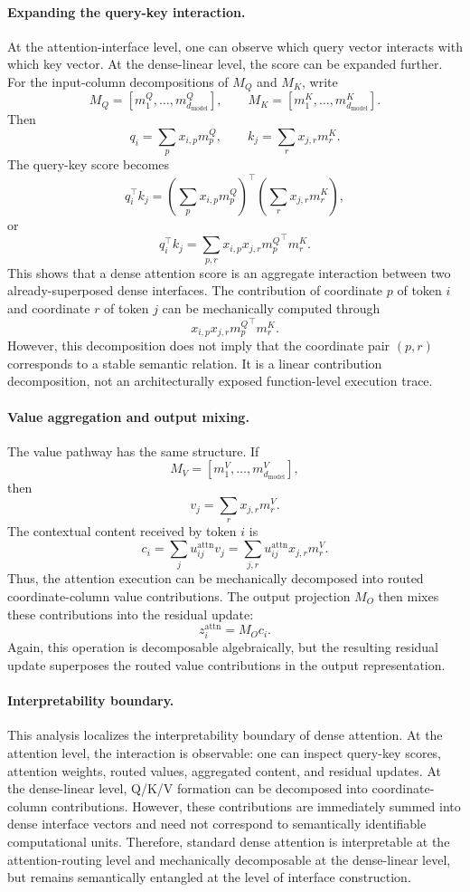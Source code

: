 \documentclass{article}
\begin{document}
\paragraph{Expanding the query-key interaction.}
At the attention-interface level, one can observe which query vector interacts with which key vector. At the dense-linear level, the score can be expanded further. For the input-column decompositions of \(M_Q\) and \(M_K\), write
\[
M_Q=[m^Q_1,\ldots,m^Q_{d_{\mathrm{model}}}],\qquad
M_K=[m^K_1,\ldots,m^K_{d_{\mathrm{model}}}].
\]
Then
\[
q_i=\sum_p x_{i,p}m^Q_p,\qquad
k_j=\sum_r x_{j,r}m^K_r.
\]
The query-key score becomes
\[
q_i^\top k_j
=
\left(\sum_p x_{i,p}m^Q_p\right)^\top
\left(\sum_r x_{j,r}m^K_r\right),
\]
or
\[
q_i^\top k_j
=
\sum_{p,r}
x_{i,p}x_{j,r}
{m^Q_p}^{\top}m^K_r.
\]
This shows that a dense attention score is an aggregate interaction between two already-superposed dense interfaces. The contribution of coordinate \(p\) of token \(i\) and coordinate \(r\) of token \(j\) can be mechanically computed through
\[
x_{i,p}x_{j,r}{m^Q_p}^{\top}m^K_r.
\]
However, this decomposition does not imply that the coordinate pair \((p,r)\) corresponds to a stable semantic relation. It is a linear contribution decomposition, not an architecturally exposed function-level execution trace.

\paragraph{Value aggregation and output mixing.}
The value pathway has the same structure. If
\[
M_V=[m^V_1,\ldots,m^V_{d_{\mathrm{model}}}],
\]
then
\[
v_j = \sum_r x_{j,r}m^V_r.
\]
The contextual content received by token \(i\) is
\[
c_i
=
\sum_j u^{\mathrm{attn}}_{ij}v_j
=
\sum_{j,r}
u^{\mathrm{attn}}_{ij}x_{j,r}m^V_r.
\]
Thus, the attention execution can be mechanically decomposed into routed coordinate-column value contributions. The output projection \(M_O\) then mixes these contributions into the residual update:
\[
z_i^{\mathrm{attn}}=M_Oc_i.
\]
Again, this operation is decomposable algebraically, but the resulting residual update superposes the routed value contributions in the output representation.

\paragraph{Interpretability boundary.}
This analysis localizes the interpretability boundary of dense attention. At the attention level, the interaction is observable: one can inspect query-key scores, attention weights, routed values, aggregated content, and residual updates. At the dense-linear level, Q/K/V formation can be decomposed into coordinate-column contributions. However, these contributions are immediately summed into dense interface vectors and need not correspond to semantically identifiable computational units. Therefore, standard dense attention is interpretable at the attention-routing level and mechanically decomposable at the dense-linear level, but remains semantically entangled at the level of interface construction.
\end{document}
